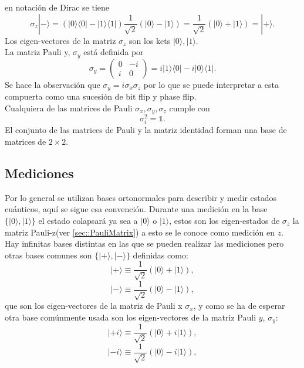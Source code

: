 \documentclass[a4paper]{article}
\begin{document}
en notación de Dirac se tiene
\begin{equation}
\sigma_z|-\rangle=(|0\rangle\langle 0|-|1\rangle\langle 1|)\frac{1}{\sqrt{2}}(|0\rangle-|1\rangle)=\frac{1}{\sqrt{2}}(|0\rangle+|1\rangle)=|+\rangle .
\end{equation}
Los eigen-vectores de la matriz $\sigma_z$ son los kets $|0\rangle, |1\rangle$.\\
La matriz Pauli y, $\sigma_y$ está definida por
\begin{equation}
\sigma_y=
	\begin{pmatrix}
		0 &-i \\
		i & 0
	\end{pmatrix}=i|1\rangle\langle 0|-i|0\rangle\langle 1|.
\end{equation}
Se hace la observación que $\sigma_y=i \sigma_x\sigma_z$ por lo que se puede interpretar a esta compuerta como una sucesión de bit flip y phase flip. \\
Cualquiera de las matrices de Pauli $\sigma_x, \sigma_y, \sigma_z$ cumple con 
\begin{equation}
\sigma_i^2=\mathbb{1}.
\end{equation}
El conjunto de las matrices de Pauli y la matriz identidad forman una base de matrices de $2\times2$.
\subsection{Mediciones}
Por lo general se utilizan bases ortonormales para describir y medir estados cuánticos, aquí se sigue esa convención. Durante una medición en la base $\{|0\rangle, |1\rangle\}$ el estado colapsará ya sea a $|0\rangle$ o $|1\rangle$, estos son los eigen-estados de $\sigma_z$ la matriz Pauli-z(ver \ref{sec::PauliMatrix}) a esto se le conoce como medición en $z$.\\
Hay infinitas bases distintas en las que se pueden realizar las mediciones pero otras bases comunes son $\{|+\rangle, |-\rangle \}$ definidas como:
\begin{equation}
|+\rangle\equiv\frac{1}{\sqrt{2}}(|0\rangle+|1\rangle),
\end{equation}
\begin{equation}
|-\rangle\equiv\frac{1}{\sqrt{2}}(|0\rangle-|1\rangle),
\end{equation}
que son los eigen-vectores de la matriz de Pauli x $\sigma_x$, y como se ha de esperar otra base comúnmente usada son los eigen-vectores de la matriz Pauli $y$, $\sigma_y$:
\begin{equation}
|+i\rangle\equiv\frac{1}{\sqrt{2}}(|0\rangle+i|1\rangle),
\end{equation}
\begin{equation}
|-i\rangle\equiv\frac{1}{\sqrt{2}}(|0\rangle-i|1\rangle),
\end{equation}
\end{document}
